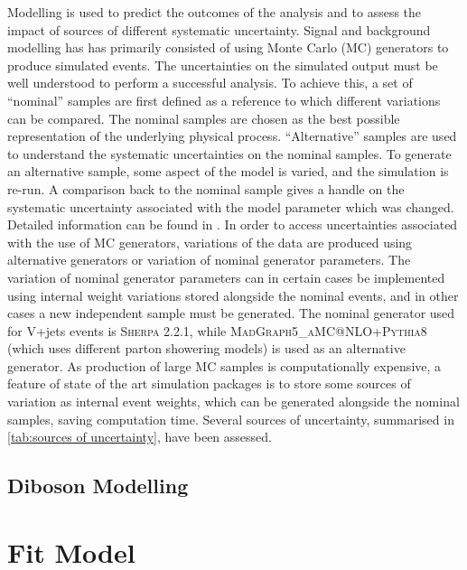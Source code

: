 Modelling is used to predict the outcomes of the analysis and to assess the impact of sources of different systematic uncertainty.
Signal and background modelling has has primarily consisted of using Monte Carlo (MC) generators to produce simulated events.
The uncertainties on the simulated output must be well understood to perform a successful analysis.
To achieve this, a set of ``nominal'' samples are first defined as a reference to which different variations can be compared.
The nominal samples are chosen as the best possible representation of the underlying physical process. ``Alternative'' samples are used to understand the systematic uncertainties on the nominal samples.
To generate an alternative sample, some aspect of the model is varied, and the simulation is re-run.
A comparison back to the nominal sample gives a handle on the systematic uncertainty associated with the model parameter which was changed.
Detailed information can be found in \cite{Bell:2316951}.
In order to access uncertainties associated with the use of MC generators, variations of the data are produced using alternative generators or variation of nominal generator parameters.
The variation of nominal generator parameters can in certain cases be implemented using internal weight variations stored alongside the nominal events, and in other cases a new independent sample must be generated. The nominal generator used for V+jets events is \textsc{Sherpa 2.2.1}, while \textsc{MadGraph5\_aMC@NLO+Pythia8} (which uses different parton showering models) is used as an alternative generator.
As production of large MC samples is computationally expensive, a feature of state of the art simulation packages is to store some sources of variation as internal event weights, which can be generated alongside the nominal samples, saving computation time. Several sources of uncertainty, summarised in \cref{tab:sources of uncertainty}, have been assessed.

%

%

\subsection{Diboson Modelling}




\section{Fit Model}

